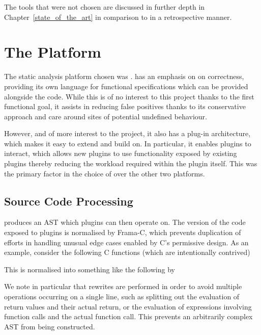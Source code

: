 The tools that were not chosen are discussed in further depth in Chapter~\ref{state_of_the_art} in comparison to  in a retrospective manner.

\section{The  Platform}

The static analysis platform chosen was .  has an emphasis on on correctness, providing its own language for functional specifications which can be provided alongside the code. While this is of no interest to this project thanks to the first functional goal, it assists in reducing false positives thanks to its conservative approach and care around sites of potential undefined behaviour.

However, and of more interest to the project, it also has a plug-in architecture, which makes it easy to extend and build on. In particular, it enables plugins to interact, which allows new plugins to use functionality exposed by existing plugins thereby reducing the workload required within the plugin itself. This was the primary factor in the choice of  over the other two platforms.

\subsection{Source Code Processing}

 produces an AST which plugins can then operate on. The version of the code exposed to plugins is normalised by Frama-C, which prevents duplication of efforts in handling unusual edge cases enabled by C's permissive design. As an example, consider the following C functions (which are intentionally contrived)



This is normalised into something like the following by 



We note in particular that rewrites are performed in order to avoid multiple operations occurring on a single line, such as splitting out the evaluation of return values and their actual return, or the evaluation of expressions involving function calls and the actual function call. This prevents an arbitrarily complex AST from being constructed.

